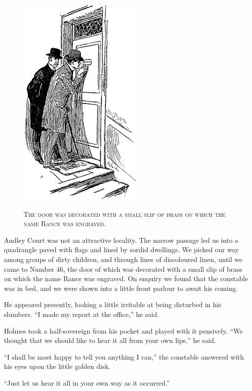 \documentclass[12pt,english,oneside]{book}
\newcommand{\noun}[1]{\textsc{#1}}
\begin{document}
%
\begin{figure}[htbp]
\noindent \begin{center}\includegraphics{images/study10-stud-07.png}\end{center}

\noindent \begin{center}\noun{The door was decorated with a small
slip of brass on which the name Rance was engraved.}\end{center}
\end{figure}
Audley Court was not an attractive locality. The narrow passage led
us into a quadrangle paved with flags and lined by sordid dwellings.
We picked our way among groups of dirty children, and through lines
of discoloured linen, until we came to Number 46, the door of which
was decorated with a small slip of brass on which the name Rance was
engraved. On enquiry we found that the constable was in bed, and we
were shown into a little front parlour to await his coming.

He appeared presently, looking a little irritable at being disturbed
in his slumbers. {}``I made my report at the office,'' he said.

Holmes took a half-sovereign from his pocket and played with it pensively.
{}``We thought that we should like to hear it all from your own lips,''
he said.

{}``I shall be most happy to tell you anything I can,'' the constable
answered with his eyes upon the little golden disk.

{}``Just let us hear it all in your own way as it occurred.''
\end{document}

